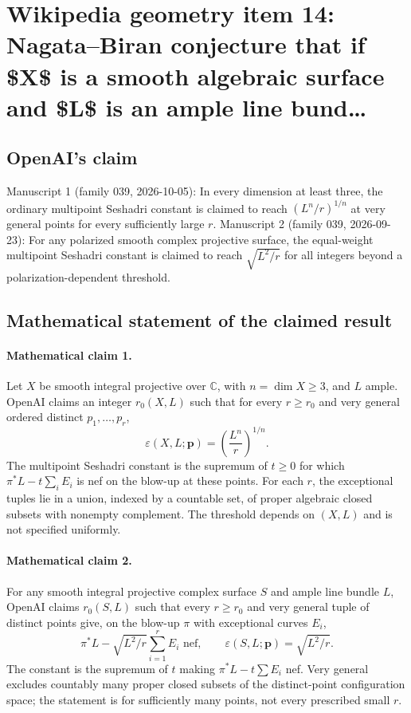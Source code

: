 \documentclass[11pt]{article}
\begin{document}
\section*{Wikipedia geometry item 14: Nagata–Biran conjecture that if \$X\$ is a smooth algebraic surface and \$L\$ is an ample line bund…}

\subsection{OpenAI's claim}
Manuscript 1 (family 039, 2026-10-05): In every dimension at least three, the ordinary multipoint Seshadri constant is claimed to reach $(L^n/r)^{1/n}$ at very general points for every sufficiently large $r$. Manuscript 2 (family 039, 2026-09-23): For any polarized smooth complex projective surface, the equal-weight multipoint Seshadri constant is claimed to reach $\sqrt{L^2/r}$ for all integers beyond a polarization-dependent threshold.

\subsection{Mathematical statement of the claimed result}
\paragraph{Mathematical claim 1.} Let $X$ be smooth integral projective over $\mathbb C$, with $n=\dim X\ge3$, and $L$ ample. OpenAI claims an integer $r_0(X,L)$ such that for every $r\ge r_0$ and very general ordered distinct $p_1,\ldots,p_r$,
\[
\varepsilon(X,L;\mathbf p)=\left(\frac{L^n}{r}\right)^{1/n}.
\]
The multipoint Seshadri constant is the supremum of $t\ge0$ for which $\pi^*L-t\sum_iE_i$ is nef on the blow-up at these points. For each $r$, the exceptional tuples lie in a union, indexed by a countable set, of proper algebraic closed subsets with nonempty complement. The threshold depends on $(X,L)$ and is not specified uniformly.

\paragraph{Mathematical claim 2.} For any smooth integral projective complex surface $S$ and ample line bundle $L$, OpenAI claims $r_0(S,L)$ such that every $r\ge r_0$ and very general tuple of distinct points give, on the blow-up $\pi$ with exceptional curves $E_i$,
\[
\pi^*L-\sqrt{L^2/r}\sum_{i=1}^rE_i\text{ nef},\qquad
\varepsilon(S,L;\mathbf p)=\sqrt{L^2/r}.
\]
The constant is the supremum of $t$ making $\pi^*L-t\sum E_i$ nef. Very general excludes countably many proper closed subsets of the distinct-point configuration space; the statement is for sufficiently many points, not every prescribed small $r$.
\end{document}
